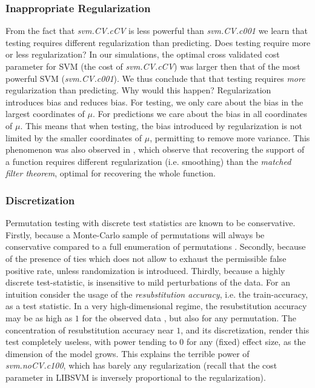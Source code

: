 \documentclass[]{bio}
\begin{document}
\subsubsection{Inappropriate Regularization}
From the fact that \emph{svm.CV.cCV} is less powerful than \emph{svm.CV.c001} we learn that testing requires different regularization than predicting.
Does testing require more or less regularization?
In our simulations, the optimal cross validated cost parameter for SVM (the cost of \emph{svm.CV.cCV}) was larger then that of the most powerful SVM (\emph{svm.CV.c001}).
We thus conclude that that testing requires \emph{more} regularization  than predicting. 
Why would this happen?
Regularization introduces bias and reduces bias. 
For testing, we only care about the bias in the largest coordinates of $\mu$. 
For predictions we care about the bias in all coordinates of $\mu$. 
This means that when testing, the bias introduced by regularization is not limited by the smaller coordinates of $\mu$, permitting to remove more variance. 
This phenomenon was also observed in \cite{cheng2017multiple}, which observe that recovering the support of a function requires different regularization (i.e. smoothing) than the \emph{matched filter theorem}, optimal for recovering the whole function.


\subsubsection{Discretization}
Permutation testing with discrete test statistics are known to be conservative.
Firstly, because a Monte-Carlo sample of permutations will always be conservative compared to a full enumeration of permutations \citep{hemerik_exact_2014}.
Secondly, because of the presence of ties which does not allow to exhaust the permissible false positive rate, unless randomization is introduced.
Thirdly, because a highly discrete test-statistic, is insensitive to mild perturbations of the data.
For an intuition consider the usage of the \emph{resubstitution accuracy}, i.e. the train-accuracy, as a test statistic. 
In a very high-dimensional regime, the resubstitution accuracy may be as high as $1$ for the observed data \cite[Theorem 1]{mclachlan_bias_1976}, but also for any permutation.
The concentration of resubstitution accuracy near $1$, and its discretization, render this test completely useless, with power tending to $0$ for any (fixed) effect size, as the dimension of the model grows. 
This explains the terrible power of \emph{svm.noCV.c100}, which has barely any regularization (recall that the cost parameter in LIBSVM is inversely proportional to the regularization). 
\end{document}
